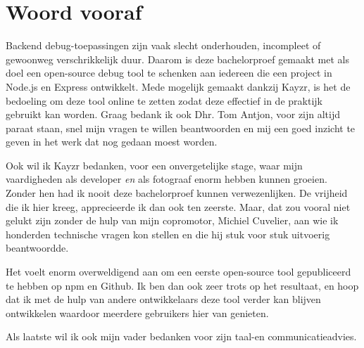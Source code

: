 
\chapter*{Woord vooraf}
\label{ch:voorwoord}


Backend debug-toepassingen zijn vaak slecht onderhouden, incompleet of gewoonweg verschrikkelijk duur. Daarom is deze bachelorproef gemaakt met als doel een open-source debug tool te schenken aan iedereen die een project in Node.js en Express ontwikkelt. Mede mogelijk gemaakt dankzij Kayzr, is het de bedoeling om deze tool online te zetten zodat deze effectief in de praktijk gebruikt kan worden. Graag bedank ik ook Dhr. Tom Antjon, voor zijn altijd paraat staan, snel mijn vragen te willen beantwoorden en mij een goed inzicht te geven in het werk dat nog gedaan moest worden.

Ook wil ik Kayzr bedanken, voor een onvergetelijke stage, waar mijn vaardigheden als developer \textit{en} als fotograaf enorm hebben kunnen groeien. Zonder hen had ik nooit deze bachelorproef kunnen verwezenlijken. De vrijheid die ik hier kreeg, apprecieerde ik dan ook ten zeerste. Maar, dat zou vooral niet gelukt zijn zonder de hulp van mijn copromotor, Michiel Cuvelier, aan wie ik honderden technische vragen kon stellen en die hij stuk voor stuk uitvoerig beantwoordde. 

Het voelt enorm overweldigend aan  om een eerste open-source tool gepubliceerd te hebben op npm en Github. Ik ben dan ook zeer trots op het resultaat, en hoop dat ik met de hulp van andere ontwikkelaars deze tool verder kan blijven ontwikkelen waardoor meerdere gebruikers hier van genieten. 

Als laatste wil ik ook mijn vader bedanken voor zijn taal-en communicatieadvies.

